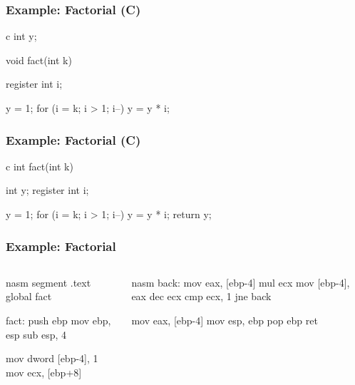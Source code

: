 \documentclass[dvipsnames]{beamer}
\begin{document}
\begin{frame}[fragile]
  \frametitle{Example: Factorial (C)}

  \begin{pygments}{c}
int y;

void fact(int k)
{
  register int i;

  y = 1;
  for (i = k; i > 1; i--)
      y = y * i;
}
  \end{pygments}
\end{frame}

\begin{frame}[fragile]
  \frametitle{Example: Factorial (C)}

  \begin{pygments}{c}
int fact(int k)
{
    int y;
    register int i;

    y = 1;
    for (i = k; i > 1; i--)
        y = y * i;
    return y;
}
  \end{pygments}
\end{frame}

\begin{frame}[fragile]
  \frametitle{Example: Factorial}

  \begin{columns}[t]
    \begin{pygments}{nasm}
segment .text
global fact

fact:
    push ebp
    mov  ebp, esp
    sub  esp, 4

    mov  dword [ebp-4], 1
    mov  ecx, [ebp+8]
    \end{pygments}

    \begin{pygments}{nasm}
back:
    mov  eax, [ebp-4]
    mul  ecx
    mov  [ebp-4], eax
    dec  ecx
    cmp  ecx, 1
    jne  back

    mov  eax, [ebp-4]
    mov  esp, ebp
    pop  ebp
    ret
    \end{pygments}
  \end{columns}
\end{frame}
\end{document}
